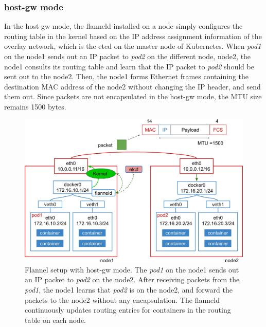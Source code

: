 \subsubsection{host-gw mode}

In the host-gw mode, the flanneld installed on a node simply configures the routing table in the kernel 
based on the IP address assignment information of the overlay network, which is  the etcd \cite{CoreOSEtcd} on the master node of Kubernetes.
When {\em pod1} on the node1 sends out an IP packet to {\em pod2} on the different node, node2, 
the node1 consults its routing table and learn that the IP packet to {\em pod2} should be sent out to the node2.
Then, the node1 forms Ethernet frames containing the destination MAC address of the node2 
without changing the IP header, and send them out.
Since packets are not encapsulated in the host-gw mode, the MTU size remains 1500 bytes.


\begin{figure}
  \centering
  \includegraphics[width=0.95\columnwidth]{Figs/flannel-host-gw}

  \par\bigskip
  \centering
  \begin{minipage}{0.9\columnwidth}
    \caption[Flannel setup with host-gw mode]{
      Flannel setup with host-gw mode.
      The {\em pod1} on the node1 sends out an IP packet to {\em pod2} on the node2.
      After receiving packets from the {\em pod1}, the node1 learns that {\em pod2} is on the node2, and forward the packets to the node2 without any encapsulation.
      The flanneld continuously updates routing entries for containers in the routing table on each node.
    }
    \label{Figs/flannel-host-gw}
  \end{minipage}
\end{figure}


